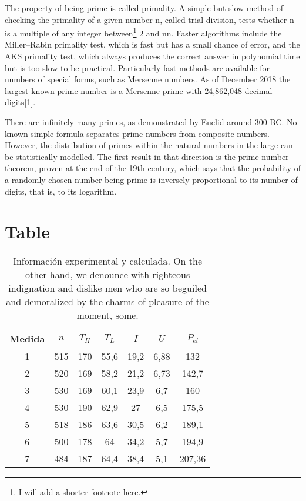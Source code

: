 The property of being prime is called primality. A simple but slow method of
checking the primality of a given number n, called trial division, tests whether
n is a multiple of any integer between\footnote{I will add a shorter footnote
  here.}  2 and { { {n}}}{ {n}}. Faster algorithms include the Miller–Rabin
primality test, which is fast but has a small chance of error, and the AKS
primality test, which always produces the correct answer in polynomial time but
is too slow to be practical. Particularly fast methods are available for numbers
of special forms, such as Mersenne numbers. As of December 2018 the largest
known prime number is a Mersenne prime with 24,862,048 decimal digits[1].

There are infinitely many primes, as demonstrated by Euclid around 300 BC. No
known simple formula separates prime numbers from composite numbers. However,
the distribution of primes within the natural numbers in the large can be
statistically modelled. The first result in that direction is the prime number
theorem, proven at the end of the 19th century, which says that the probability
of a randomly chosen number being prime is inversely proportional to its number
of digits, that is, to its logarithm.


\section{Table}

\begin{table}[ht]
  \centering
  \renewcommand{\arraystretch}{1.25}
  \setlength{\tabcolsep}{1.5\tabcolsep}
  \caption{Información experimental y calculada. On the other hand, we denounce
    with righteous indignation and dislike men who are so beguiled and
    demoralized by the charms of pleasure of the moment, some.}
  \label{tab:info}
  \begin{tabular}{*7c} \toprule
    Medida & $n$ & $T_H$ & $T_L$ & $I$ & $U$ & $P_{el}$ \\
    \midrule
    1  & 515 & 170 & 55,6 & 19,2  & 6,88 & 132    \\
    2  & 520 & 169 & 58,2 & 21,2  & 6,73 & 142,7  \\
    3  & 530 & 169 & 60,1 & 23,9  & 6,7  & 160    \\
    4  & 530 & 190 & 62,9 & 27    & 6,5  & 175,5  \\
    5  & 518 & 186 & 63,6 & 30,5  & 6,2  & 189,1  \\
    6  & 500 & 178 & 64   & 34,2  & 5,7  & 194,9  \\
    7  & 484 & 187 & 64,4 & 38,4  & 5,1  & 207,36 \\
    \bottomrule
  \end{tabular}
\end{table}



